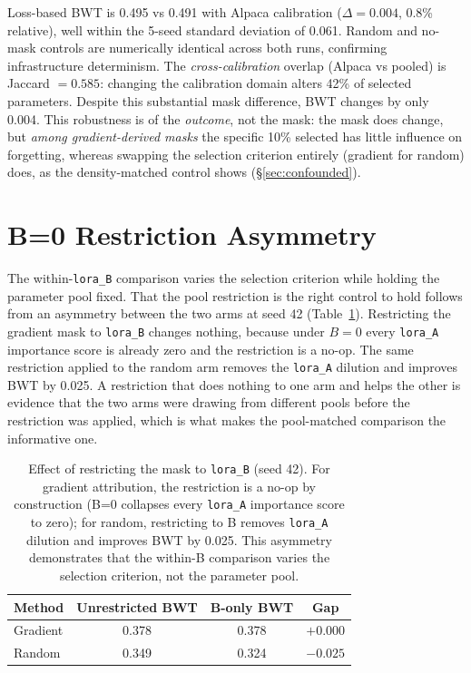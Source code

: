 Loss-based BWT is 0.495 vs 0.491 with Alpaca calibration ($\Delta = 0.004$, 0.8\% relative), well within the 5-seed standard deviation of 0.061. Random and no-mask controls are numerically identical across both runs, confirming infrastructure determinism. The \emph{cross-calibration} overlap (Alpaca vs pooled) is Jaccard $= 0.585$: changing the calibration domain alters 42\% of selected parameters. Despite this substantial mask difference, BWT changes by only 0.004. This robustness is of the \emph{outcome}, not the mask: the mask does change, but \emph{among gradient-derived masks} the specific 10\% selected has little influence on forgetting, whereas swapping the selection criterion entirely (gradient for random) does, as the density-matched control shows (\S\ref{sec:confounded}).

\section{B=0 Restriction Asymmetry}
\label{app:b0_asymmetry}

The within-\texttt{lora\_B} comparison varies the selection criterion while holding the parameter pool fixed. That the pool restriction is the right control to hold follows from an asymmetry between the two arms at seed 42 (Table~\ref{tab:b0_asymmetry}). Restricting the gradient mask to \texttt{lora\_B} changes nothing, because under $B=0$ every \texttt{lora\_A} importance score is already zero and the restriction is a no-op. The same restriction applied to the random arm removes the \texttt{lora\_A} dilution and improves BWT by 0.025. A restriction that does nothing to one arm and helps the other is evidence that the two arms were drawing from different pools before the restriction was applied, which is what makes the pool-matched comparison the informative one.

\begin{table}[h]
\centering\small
\caption{Effect of restricting the mask to \texttt{lora\_B} (seed 42). For gradient attribution, the restriction is a no-op by construction (B=0 collapses every \texttt{lora\_A} importance score to zero); for random, restricting to B removes \texttt{lora\_A} dilution and improves BWT by 0.025. This asymmetry demonstrates that the within-B comparison varies the selection criterion, not the parameter pool.}
\label{tab:b0_asymmetry}
\begin{tabular}{@{}lccc@{}}
\toprule
\textbf{Method} & \textbf{Unrestricted BWT} & \textbf{B-only BWT} & \textbf{Gap} \\
\midrule
Gradient & 0.378 & 0.378 & $+0.000$ \\
Random   & 0.349 & 0.324 & $-0.025$ \\
\bottomrule
\end{tabular}
\end{table}


